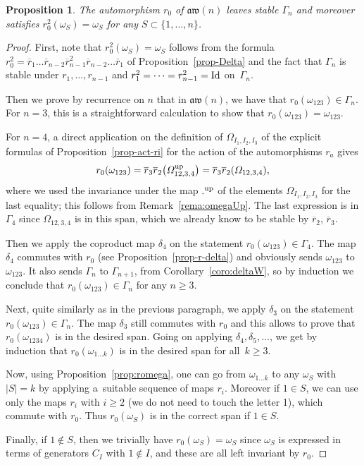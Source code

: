 \documentclass[pdftex]{sigma}
\numberwithin{equation}{section}
\newtheorem{prop}[theo]{Proposition}
\theoremstyle{definition}
\newcommand{\rb}{\overline{r}}
\newcommand{\aw}{\mathfrak{aw}(n)}
\begin{document}
\begin{prop}
The automorphism $r_0$ of $\aw$ leaves stable $\Gamma_n$ and moreover satisfies $r_0^2(\omega_S)=\omega_S$ for any $S\subset\{1,\dots,n\}$.
\end{prop}
\begin{proof}
First, note that $r_0^2(\omega_S)=\omega_S$ follows from the formula $r_0^2=\rb_1\dots \rb_{n-2}\rb_{n-1}^2\rb_{n-2}\dots \rb_1$ of Proposition~\ref{prop-Delta} and the fact that $\Gamma_n$ is stable under $r_1,\dots,r_{n-1}$ and $r_1^2=\dots=r_{n-1}^2={\rm Id}$ on~$\Gamma_n$.

Then we prove by recurrence on $n$ that in $\aw$, we have that $r_0(\omega_{123})\in\Gamma_n$. For $n=3$, this is a straightforward calculation to show that $r_0(\omega_{123})=\omega_{123}$.

For $n=4$, a direct application on the definition of $\varOmega_{I_1,I_2,I_3}$ of the explicit formulas of Proposition~\ref{prop-act-ri} for the action of the automorphisms $r_a$ gives
\[r_0(\omega_{123})=\rb_3\rb_2\big(\varOmega_{12,3,4}^{\rm up}\big)=\rb_3\rb_2(\varOmega_{12,3,4}) ,\]
where we used the invariance under the map ${.}^{\rm up}$ of the elements $\varOmega_{I_1,I_2,I_3}$ for the last equality; this follows from Remark~\ref{rema:omegaUp}. The last expression is in $\Gamma_4$ since $\varOmega_{12,3,4}$ is in this span, which we already know to be stable by $\rb_2$, $\rb_3$.

Then we apply the coproduct map $\delta_4$ on the statement $r_0(\omega_{123})\in\Gamma_4$. The map $\delta_4$ commutes with $r_0$ (see Proposition~\ref{prop-r-delta}) and obviously sends $\omega_{123}$ to $\omega_{123}$. It also sends $\Gamma_n$ to $\Gamma_{n+1}$, from Corollary~\ref{coro:deltaW}, so by induction we conclude that $r_0(\omega_{123})\in\Gamma_n$ for any $n\geq 3$.

Next, quite similarly as in the previous paragraph, we apply $\delta_3$ on the statement ${r_0(\omega_{123})\!\in\!\Gamma_n}$. The map $\delta_3$ still commutes with $r_0$ and this allows to prove that $r_0(\omega_{1234})$ is in the desired span. Going on applying $\delta_4,\delta_5,\dots $, we get by induction that $r_0(\omega_{1\dots k})$ is in the desired span for all~$k\geq 3$.

Now, using Proposition~\ref{prop:romega}, one can go from $\omega_{1\dots k}$ to any $\omega_S$ with $|S|=k$ by applying a~suitable sequence of maps $r_i$. Moreover if $1\in S$, we can use only the maps $r_i$ with $i\geq 2$ (we do not need to touch the letter 1), which commute with $r_0$. Thus $r_0(\omega_S)$ is in the correct span if $1\in S$.

Finally, if $1\notin S$, then we trivially have $r_0(\omega_S)=\omega_S$ since $\omega_S$ is expressed in terms of generators $C_I$ with $1\notin I$, and these are all left invariant by $r_0$.
\end{proof}
\end{document}
